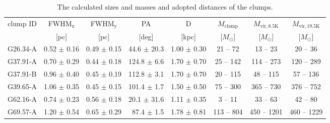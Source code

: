 \documentclass[printer]{aa}
\begin{document}
\begin{table*}[t]
	\centering
\footnotesize
	\caption{The calculated sizes and masses and adopted distances of the clumps.}
		\begin{tabular}{l r r r r c c c}
		\hline
		\multicolumn{1}{c}{clump ID} & \multicolumn{1}{c}{FWHM$\mathrm{_{x}}$} & \multicolumn{1}{c}{FWHM$\mathrm{_{y}}$} & \multicolumn{1}{c}{PA} & \multicolumn{1}{c}{D} & \multicolumn{1}{c}{$M\mathrm{_{clump}}$} & \multicolumn{1}{c}{$M\mathrm{_{vir,8.5K}}$}  & \multicolumn{1}{c}{$M\mathrm{_{vir,19.5K}}$}\\
	\multicolumn{1}{c}{\ } & \multicolumn{1}{c}{[pc]} & \multicolumn{1}{c}{[pc]} & \multicolumn{1}{c}{[deg]} & \multicolumn{1}{c}{[kpc]} & \multicolumn{1}{c}{[$M_{\odot}$]} & \multicolumn{1}{c}{[$M_{\odot}$]} & \multicolumn{1}{c}{[$M_{\odot}$]}\\
		\hline
		\hline
G26.34-A & 0.52 $\pm$ 0.16 & 0.49 $\pm$ 0.15 &  44.6 $\pm$  20.3 & 1.00 $\pm$ 0.30 &   21 --   72 &   13 --   23 &   20 --   36 \\
G37.91-A & 0.70 $\pm$ 0.29 & 0.44 $\pm$ 0.18 & 124.8 $\pm$   6.6 & 1.70 $\pm$ 0.70 &   25 --  142 &  114 --  273 &  120 --  289 \\
G37.91-B & 0.96 $\pm$ 0.40 & 0.45 $\pm$ 0.19 & 112.8 $\pm$   3.1 & 1.70 $\pm$ 0.70 &   20 --  115 &   48 --  115 &   57 --  136 \\
G39.65-A & 1.06 $\pm$ 0.35 & 0.45 $\pm$ 0.15 & 101.4 $\pm$   1.7 & 1.50 $\pm$ 0.50 &   75 --  300 &  365 --  730 &  376 --  752 \\
G62.16-A & 0.74 $\pm$ 0.23 & 0.56 $\pm$ 0.18 &  20.1 $\pm$  31.6 & 1.11 $\pm$ 0.35 &    3 --   11 &   33 --   63 &   42 --   80 \\
G69.57-A & 1.20 $\pm$ 0.54 & 0.65 $\pm$ 0.29 &  87.4 $\pm$   1.5 & 1.78 $\pm$ 0.81 &  113 --  804 &  450 -- 1201 &  460 -- 1229 \\

\end{tabular}
\end{table*}
\end{document}
